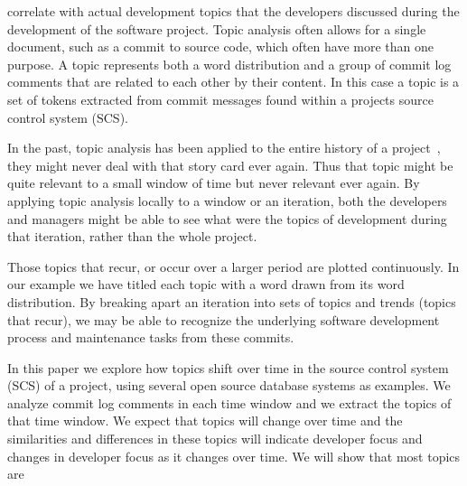 \documentclass[times, 10pt,twocolumn]{article}
\newcommand{\hla}[1]{{\color{changecolor2} #1 }}
\begin{document}
correlate with actual development topics that the developers discussed
during the development of the software project. 
Topic analysis often allows for a single document, such as a commit
\hla{
to source code, which often have more than one purpose.  A topic
represents both a word distribution and a group of commit log comments
that are related to each other by their content.  In this case a topic
is a set of tokens extracted from commit messages found within a
projects source control system (SCS). 
}

\hla{
In the past, topic analysis has been applied to the entire history of a project~\cite{1321709,lukins2008,10.1109/ICPC.2007.13},
}
 they might never deal with that
story card ever again. Thus that topic might be quite relevant to a
small window of time but never relevant ever again.  By applying topic
analysis locally to a window or an iteration, both the developers and managers
might be able to see what were the topics of development during that
iteration, rather than the whole project.

 Those topics that
recur, or occur over a larger period are plotted continuously. In our
example we have titled each topic with a word drawn from its
word distribution.  
By breaking apart an iteration into sets of topics
and trends (topics that recur), we may be able to recognize the
underlying software development process and maintenance tasks from these
commits. 




In this paper we explore how topics shift over time in the source
control system (SCS) of a project, using several open source database
systems as examples. We analyze commit log comments in each time
window and we extract the topics of that time window. We expect that
topics will change over time and the similarities and differences in
these topics will indicate developer focus and changes in developer
focus as it changes over time. We will show that most topics are
\end{document}
